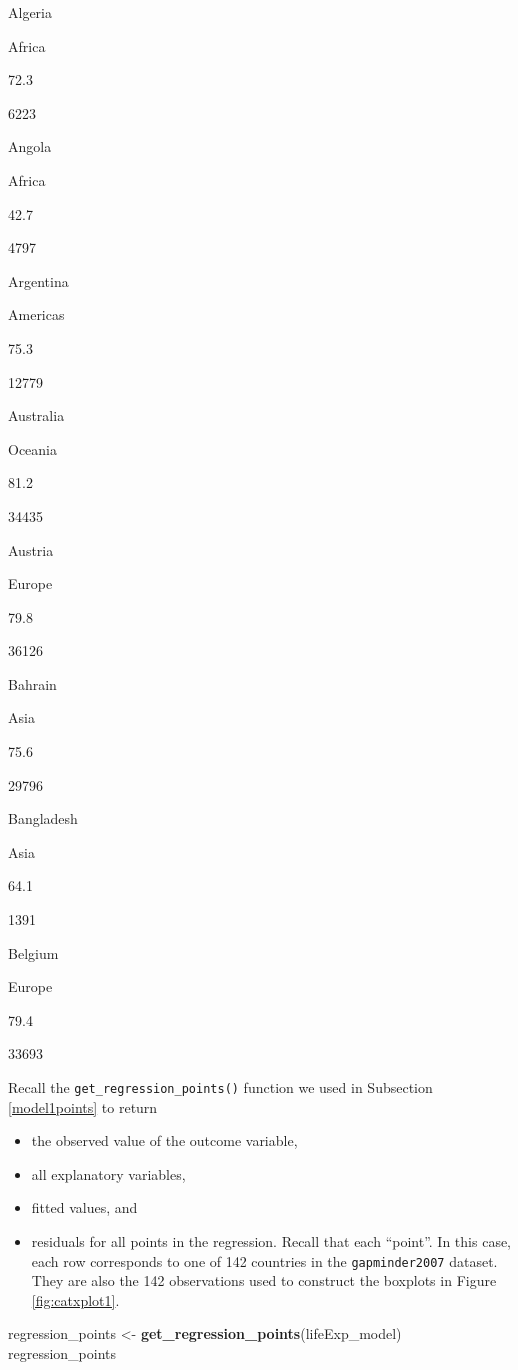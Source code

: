 \documentclass[12pt,]{krantz}
\makeatletter
\newenvironment{Shaded}{\begin{snugshade}}{\end{snugshade}}
\newcommand{\KeywordTok}[1]{\textcolor[rgb]{0.27,0.27,0.27}{\textbf{#1}}}
\newcommand{\StringTok}[1]{\textcolor[rgb]{0.5,0.5,0.5}{#1}}
\newcommand{\NormalTok}[1]{#1}
\providecommand{\tightlist}{%
  \setlength{\itemsep}{0pt}\setlength{\parskip}{0pt}}
\newenvironment{kframe}{%
\medskip{}
\setlength{\fboxsep}{.8em}
 \def\at@end@of@kframe{}%
 \ifinner\ifhmode%
  \def\at@end@of@kframe{\end{minipage}}%
  \begin{minipage}{\columnwidth}%
 \fi\fi%
 \def\FrameCommand##1{\hskip\@totalleftmargin \hskip-\fboxsep
 \colorbox{shadecolor}{##1}\hskip-\fboxsep
     \hskip-\linewidth \hskip-\@totalleftmargin \hskip\columnwidth}%
 \MakeFramed {\advance\hsize-\width
   \@totalleftmargin\z@ \linewidth\hsize
   \@setminipage}}%
 {\par\unskip\endMakeFramed%
 \at@end@of@kframe}
\renewenvironment{Shaded}{\begin{kframe}}{\end{kframe}}
\makeatother
\begin{document}
Algeria

Africa

72.3

6223

Angola

Africa

42.7

4797

Argentina

Americas

75.3

12779

Australia

Oceania

81.2

34435

Austria

Europe

79.8

36126

Bahrain

Asia

75.6

29796

Bangladesh

Asia

64.1

1391

Belgium

Europe

79.4

33693

Recall the \texttt{get\_regression\_points()} function we used in
Subsection \ref{model1points} to return

\begin{itemize}
\tightlist
\item
  the observed value of the outcome variable,
\item
  all explanatory variables,
\item
  fitted values, and
\item
  residuals for all points in the regression. Recall that each
  ``point''. In this case, each row corresponds to one of 142 countries
  in the \texttt{gapminder2007} dataset. They are also the 142
  observations used to construct the boxplots in Figure
  \ref{fig:catxplot1}.
\end{itemize}

\begin{Shaded}
\begin{Highlighting}[]
\NormalTok{regression_points <-}\StringTok{ }\KeywordTok{get_regression_points}\NormalTok{(lifeExp_model)}
\NormalTok{regression_points}
\end{Highlighting}
\end{Shaded}
\end{document}
